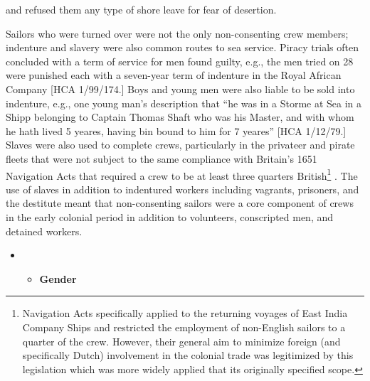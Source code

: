 and refused them any type of shore leave for fear of desertion. 

Sailors who were turned over were not the only non-consenting crew members; indenture and slavery were also common routes to sea service. Piracy trials often concluded with a term of service for men found guilty, e.g., the men tried on 28 \citealt{March1722} were punished each with a seven-year term of indenture in the Royal African Company [HCA 1/99/174.] Boys and young men were also liable to be sold into indenture, e.g., one young man’s description that “he was in a Storme at Sea in a Shipp belonging to Captain Thomas Shaft who was his Master, and with whom he hath lived 5 yeares, having bin bound to him for 7 yeares” [HCA 1/12/79.] Slaves were also used to complete crews, particularly in the privateer and pirate fleets that were not subject to the same compliance with Britain's 1651 Navigation Acts that required a crew to be at least three quarters British\footnote{\citealt{The1651} Navigation Acts specifically applied to the returning voyages of East India Company Ships and restricted the employment of non-English sailors to a quarter of the crew. However, their general aim to minimize foreign (and specifically Dutch) involvement in the colonial trade was legitimized by this legislation which was more widely applied that its originally specified scope.} . The use of slaves in addition to indentured workers including vagrants, prisoners, and the destitute meant that non-consenting sailors were a core component of crews in the early colonial period in addition to volunteers, conscripted men, and detained workers. 


\begin{itemize}
\item 
\begin{itemize}
\item \textbf{Gender}
\end{itemize}
\end{itemize}

